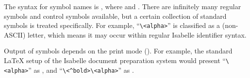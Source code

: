 \begin{isabellebody}
\begin{isamarkuptext}

The  syntax for symbol names is , where  and .  There are infinitely many regular symbols and
control symbols available, but a certain collection of standard
symbols is treated specifically.  For example,
``\verb,\,\verb,<alpha>,'' is classified as a (non-ASCII) letter,
which means it may occur within regular Isabelle identifier syntax.

Output of symbols depends on the print mode ().
For example, the standard {\LaTeX} setup of the Isabelle document
preparation system would present ``\verb,\,\verb,<alpha>,'' as \isa{{\isasymalpha}}, and ``\verb,\,\verb,<^bold>,\verb,\,\verb,<alpha>,'' as \isa{\isactrlbold {\isasymalpha}}.


\end{isamarkuptext}
\end{isabellebody}

